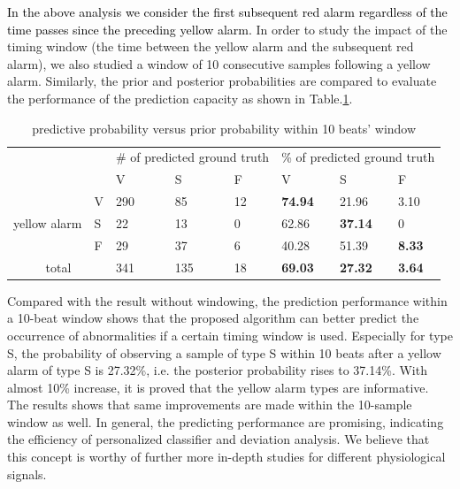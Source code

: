 \textcolor{black}{In the above analysis we consider the first subsequent red alarm regardless of the time passes since the preceding yellow alarm.} In order to study the impact of the timing window (the time between the yellow alarm and the subsequent red alarm), we also studied a window of 10 consecutive samples following a yellow alarm. Similarly, the prior and posterior probabilities are compared to evaluate the performance of the prediction capacity as shown in Table.\ref{table:pred10}. %


\begin{table}[t]
\centering
\caption{predictive probability versus prior probability within 10 beats' window}
\label{table:pred10}
\begin{tabular}{|c|l|l|l|l||l|l|l|}
\hline
\multicolumn{2}{|l|}{\multirow{2}{*}{}} & \multicolumn{3}{l|}{\# of predicted ground truth} & \multicolumn{3}{l|}{\% of predicted ground truth} \\ \cline{3-8} 
\multicolumn{2}{|l|}{}                  & V               & S               & F             & V               & S               & F             \\ \hline
\multirow{3}{*}{yellow alarm}    & V    & 290             & 85              & 12            & \textbf{74.94}  & 21.96           & 3.10          \\ \cline{2-8} 
                                 & S    & 22              & 13              & 0             & 62.86           & \textbf{37.14}  & 0             \\ \cline{2-8} 
                                 & F    & 29              & 37              & 6             & 40.28           & 51.39           & \textbf{8.33} \\ \hline
\multicolumn{2}{|c|}{total}             & 341             & 135             & 18            & \textbf{69.03}  & \textbf{27.32}  & \textbf{3.64} \\ \hline
\end{tabular}
\end{table}

Compared with the result without windowing, the prediction performance within a 10-beat window shows that the proposed algorithm can better predict the occurrence of abnormalities if a certain timing window is used. Especially for type S, the probability of observing a sample of type S within 10 beats after a yellow alarm of type S is 27.32\%, %
i.e. the posterior probability rises to 37.14\%. With almost 10\% increase, it is proved that the yellow alarm types are informative. The results shows that same improvements are made within the 10-sample window as well. In general, the predicting performance are promising, indicating the efficiency of personalized classifier and deviation analysis. We believe that this concept is worthy of further more in-depth studies for different physiological signals.




